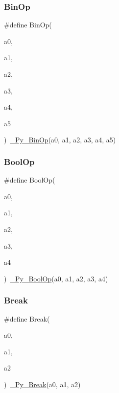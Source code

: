 \mbox{\label{_python-ast_8h_a5288875143f3b5555cb1c1d5eb371e0d}} 
\subsubsection{\texorpdfstring{BinOp}{BinOp}}
{\footnotesize\ttfamily \#define Bin\+Op(\begin{DoxyParamCaption}\item[{}]{a0,  }\item[{}]{a1,  }\item[{}]{a2,  }\item[{}]{a3,  }\item[{}]{a4,  }\item[{}]{a5 }\end{DoxyParamCaption})~\mbox{\hyperlink{_python-ast_8h_ab7097e515f5a83d39487d5a585463dac}{\+\_\+\+Py\+\_\+\+Bin\+Op}}(a0, a1, a2, a3, a4, a5)}

\mbox{\label{_python-ast_8h_a4bab162f247adb9c24bea326f7dce65c}} 
\subsubsection{\texorpdfstring{BoolOp}{BoolOp}}
{\footnotesize\ttfamily \#define Bool\+Op(\begin{DoxyParamCaption}\item[{}]{a0,  }\item[{}]{a1,  }\item[{}]{a2,  }\item[{}]{a3,  }\item[{}]{a4 }\end{DoxyParamCaption})~\mbox{\hyperlink{_python-ast_8h_a8441169f71a59d05748d4652ad0f691f}{\+\_\+\+Py\+\_\+\+Bool\+Op}}(a0, a1, a2, a3, a4)}

\mbox{\label{_python-ast_8h_a6d6a655cbc825addae6355c2ece3395b}} 
\subsubsection{\texorpdfstring{Break}{Break}}
{\footnotesize\ttfamily \#define Break(\begin{DoxyParamCaption}\item[{}]{a0,  }\item[{}]{a1,  }\item[{}]{a2 }\end{DoxyParamCaption})~\mbox{\hyperlink{_python-ast_8h_a9bddbd991d9285df556fcda52f160aec}{\+\_\+\+Py\+\_\+\+Break}}(a0, a1, a2)}

